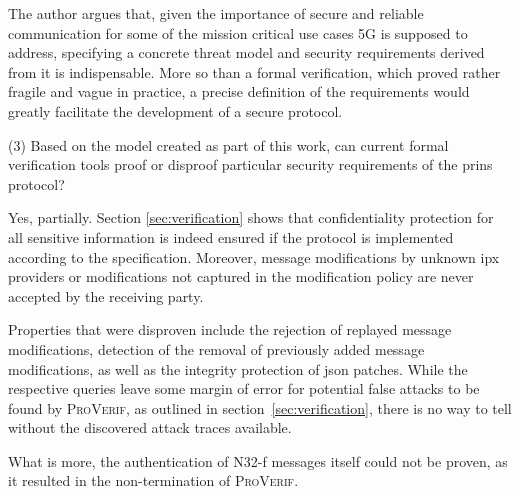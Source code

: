 The author argues that, given the importance of secure and reliable communication for some of the mission critical use cases 5G is supposed to address, specifying a concrete threat model and security requirements derived from it is indispensable.
More so than a formal verification, which proved rather fragile and vague in practice, a precise definition of the requirements would greatly facilitate the development of a secure protocol.\bigskip

\noindent
(3) Based on the model created as part of this work, can current formal verification tools proof or disproof particular security requirements of the \gls{prins} protocol?

Yes, partially.
Section \ref{sec:verification} shows that confidentiality protection for all sensitive information is indeed ensured if the protocol is implemented according to the specification.
Moreover, message modifications by unknown \gls{ipx} providers or modifications not captured in the modification policy are never accepted by the receiving party.

Properties that were disproven include the rejection of replayed message modifications, detection of the removal of previously added message modifications, as well as the integrity protection of \gls{json} patches.
While the respective queries leave some margin of error for potential false attacks to be found by \textsc{ProVerif}, as outlined in section~\ref{sec:verification}, there is no way to tell without the discovered attack traces available.

What is more, the authentication of N32-f messages itself could not be proven, as it resulted in the non-termination of \textsc{ProVerif}.
